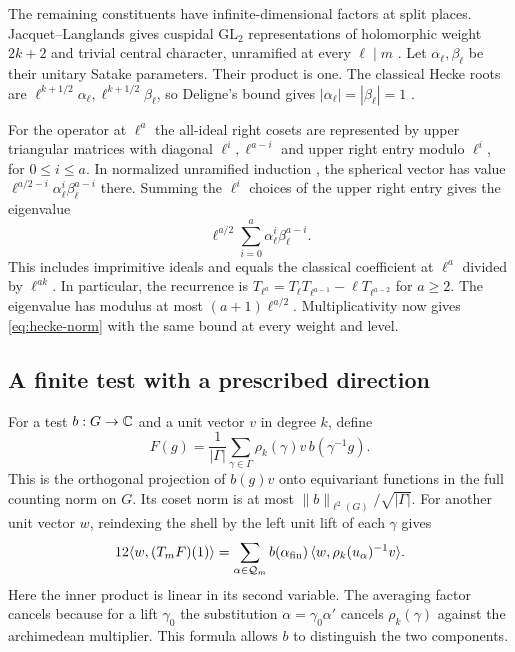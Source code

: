 The remaining constituents have infinite-dimensional factors
at split places. Jacquet--Langlands gives cuspidal
\(\mathrm{GL}_2\) representations of holomorphic weight \(2k+2\)
and trivial central character, unramified at every \(\ell\mid m\)
\cite[Theorem~14.4 and Proposition~5.20]{JL}.
Let \(\alpha_\ell,\beta_\ell\) be their unitary Satake parameters.
Their product is one. The classical Hecke roots are
\(\ell^{k+1/2}\alpha_\ell,\ell^{k+1/2}\beta_\ell\), so Deligne's
bound gives \(|\alpha_\ell|=|\beta_\ell|=1\)
\cite[Theorems~4.9 and~5.1]{DeligneModular}
\cite[Theorem~1.6]{DeligneWeil}.

For the operator at \(\ell^a\) the all-ideal right cosets are
represented by upper triangular matrices with diagonal
\(\ell^i,\ell^{a-i}\) and upper right entry modulo \(\ell^i\),
for \(0\le i\le a\). In normalized unramified induction
\cite[Section~3]{JL}, the spherical vector has value
\(\ell^{a/2-i}\alpha_\ell^i\beta_\ell^{a-i}\) there.
Summing the \(\ell^i\) choices of the upper right entry gives the
eigenvalue
\[
 \ell^{a/2}\sum_{i=0}^{a}\alpha_\ell^i\beta_\ell^{a-i}.
\]
This includes imprimitive ideals and equals the classical
coefficient at \(\ell^a\) divided by \(\ell^{ak}\). In particular,
the recurrence is
\(T_{\ell^a}=T_\ell T_{\ell^{a-1}}-\ell T_{\ell^{a-2}}\) for
\(a\ge2\). The eigenvalue has modulus at most
\((a+1)\ell^{a/2}\). Multiplicativity now gives
\eqref{eq:hecke-norm} with the same bound at every weight and level.

\subsection{A finite test with a prescribed direction}
For a test \(b:G\to\mathbb C\) and a unit vector \(v\) in degree \(k\), define
\[
 F(g)=\frac1{|\Gamma|}\sum_{\gamma\in\Gamma}
                      \rho_k(\gamma)v\, b(\gamma^{-1}g).
\]
This is the orthogonal projection of \(b(g)v\) onto equivariant
functions in the full counting norm on \(G\). Its coset norm is at most
\(\|b\|_{\ell^2(G)}/\sqrt{|\Gamma|}\).
For another unit vector \(w\), reindexing the shell by the left
unit lift of each \(\gamma\) gives
\begin{equation}\label{eq:projection}
 12\langle w,(T_mF)(1)\rangle
 =\sum_{\alpha\in\mathcal Q_m}
       b(\alpha_{\rm fin})\,\langle w,\rho_k(u_\alpha)^{-1}v\rangle .
\end{equation}
Here the inner product is linear in its second variable.
The averaging factor cancels because for a lift \(\gamma_0\)
the substitution \(\alpha=\gamma_0\alpha'\) cancels
\(\rho_k(\gamma)\) against the archimedean multiplier.
This formula allows \(b\) to distinguish the two components.

